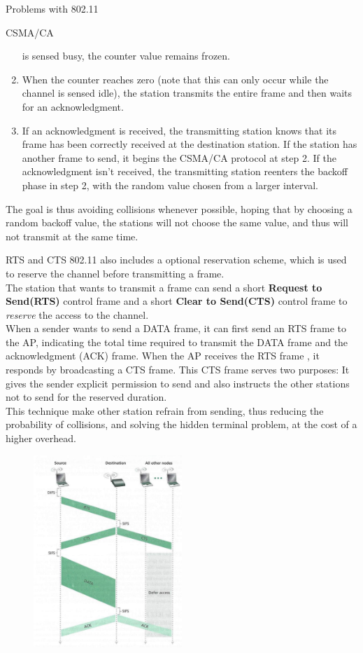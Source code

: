 \begin{section}{Problems with 802.11}
\begin{subsection}{CSMA/CA}
\begin{enumerate}
         is sensed busy, the counter value remains frozen.
      \item When the counter reaches zero (note that this can only occur while the channel is 
        sensed idle), the station transmits the entire frame and then waits for an acknowledgment.
      \item If an acknowledgment is received, the transmitting station knows that its frame has 
        been correctly received at the destination station. If the station has another 
        frame to send, it begins the CSMA/CA protocol at step 2. If the acknowledgment isn't 
        received, the transmitting station reenters the backoff phase in step 2, with the random 
        value chosen from a larger interval.
    \end{enumerate}
    The goal is thus avoiding collisions whenever possible, hoping that by choosing a random
    backoff value, the stations will not choose the same value, and thus will not transmit at the
    same time.
    \begin{subsubsection}{RTS and CTS}
      802.11 also includes a optional reservation scheme, which is used to reserve the channel before
      transmitting a frame.\\
      The station that wants to transmit a frame can send a short \textbf{Request to Send(RTS)} 
      control frame and a short \textbf{Clear to Send(CTS)} control frame to \textit{reserve} the
      access to the channel.\\
      When a sender wants to send a DATA frame, it can first send an RTS frame to the AP, indicating 
      the total time required to transmit the DATA frame and the acknowledgment (ACK) frame. When 
      the AP receives the RTS frame , it responds by broadcasting a CTS frame. This CTS frame serves 
      two purposes: It gives the sender explicit permission to send and also instructs the other 
      stations not to send for the reserved duration.\\
      This technique make other station refrain from sending, thus reducing the probability of
      collisions, and solving the hidden terminal problem, at the cost of a higher overhead.
      \begin{figure}[h]
        \centering
        \includegraphics[width=0.5\textwidth]{img/wireless/cmsa with RTS.png}

\end{figure}
\end{subsubsection}
\end{subsection}
\end{section}
